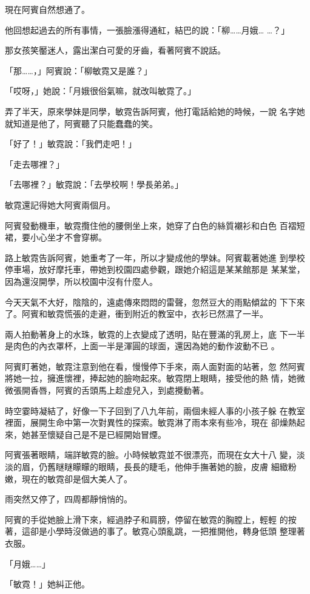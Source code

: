 現在阿賓自然想通了。

他回想起過去的所有事情，一張臉漲得通紅，結巴的說：「柳……月娥…
…？」

那女孩笑靨迷人，露出潔白可愛的牙齒，看著阿賓不說話。

「那……，」阿賓說：「柳敏霓又是誰？」

「哎呀，」她說：「月娥很俗氣嘛，就改叫敏霓了。」

弄了半天，原來學妹是同學，敏霓告訴阿賓，他打電話給她的時候，一說
名字她就知道是他了，阿賓聽了只能蠢蠢的笑。

「好了！」敏霓說：「我們走吧！」

「走去哪裡？」

「去哪裡？」敏霓說：「去學校啊！學長弟弟。」

敏霓還記得她大阿賓兩個月。

阿賓發動機車，敏霓攬住他的腰側坐上來，她穿了白色的絲質襯衫和白色
百褶短裙，要小心坐才不會穿梆。

路上敏霓告訴阿賓，她重考了一年，所以才變成他的學妹。阿賓載著她進
到學校停車場，放好摩托車，帶她到校園四處參觀，跟她介紹這是某某館那是
某某堂，因為還沒開學，所以校園中沒有什麼人。

今天天氣不大好，陰陰的，遠處傳來悶悶的雷聲，忽然豆大的雨點傾盆的
下下來了。阿賓和敏霓慌張的走避，衝到附近的教室中，衣衫已然濕了一半。

兩人拍動著身上的水珠，敏霓的上衣變成了透明，貼在豐滿的乳房上，底
下一半是肉色的內衣罩杯，上面一半是渾圓的球面，還因為她的動作波動不已
。

阿賓盯著她，敏霓注意到他在看，慢慢停下手來，兩人面對面的站著，忽
然阿賓將她一拉，擁進懷裡，捧起她的臉吻起來。敏霓閉上眼睛，接受他的熱
情，她微微張開香唇，阿賓的舌頭馬上趁虛兒入，到處攪動著。

時空霎時凝結了，好像一下子回到了八九年前，兩個未經人事的小孩子躲
在教室裡面，展開生命中第一次對異性的探索。敏霓淋了雨本來有些冷，現在
卻燥熱起來，她甚至懷疑自己是不是已經開始冒煙。

阿賓張著眼睛，端詳敏霓的臉。小時候敏霓並不很漂亮，而現在女大十八
變，淡淡的眉，仍舊瞇瞇矇矇的眼睛，長長的睫毛，他伸手撫著她的臉，皮膚
細緻粉嫩，現在的敏霓卻是個大美人了。

雨突然又停了，四周都靜悄悄的。

阿賓的手從她臉上滑下來，經過脖子和肩膀，停留在敏霓的胸膛上，輕輕
的按著，這卻是小學時沒做過的事了。敏霓心頭亂跳，一把推開他，轉身低頭
整理著衣服。

「月娥……」

「敏霓！」她糾正他。

